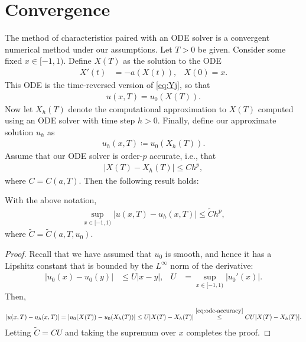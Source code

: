 \documentclass[11pt]{amsart}
\begin{document}
  \section{Convergence}
  The method of characteristics paired with an ODE solver is a convergent numerical method under our assumptions. Let $T >0$ be given. Consider some fixed $x \in [-1,1)$. Define $X(T)$ as the solution to the ODE
    \begin{align}\label{eq:X-ode}
      X'(t) &= -a(X(t)), & X(0) = x.
    \end{align}
    This ODE is the time-reversed version of \eqref{eq:Yj}, so that 
    \begin{align*}
      u(x,T) = u_0(X(T)).
    \end{align*}
    Now let $X_h(T)$ denote the computational approximation to $X(T)$ computed using an ODE solver with time step $h > 0$. Finally, define our approximate solution $u_h$ as
    \begin{align*}
      u_h(x,T) \coloneqq u_0(X_h(T)).
    \end{align*}
    Assume that our ODE solver is order-$p$ accurate, i.e., that
    \begin{align}\label{eq:ode-accuracy}
      \left| X(T) - X_h(T) \right| \leq C h^p,
    \end{align}
    where $C = C(a,T)$. Then the following result holds:
  \begin{proposition}
    With the above notation,
    \begin{align}\label{eq:ode-accuracy}
      \sup_{x \in [-1,1)} \left| u(x,T) - u_h(x,T) \right| \leq \widetilde{C} h^p,
    \end{align}
    where $\widetilde{C} = \widetilde{C}(a, T, u_0)$.
  \end{proposition}
  \begin{proof}
    Recall that we have assumed that $u_0$ is smooth, and hence it has a Lipshitz constant that is bounded by the $L^\infty$ norm of the derivative:
    \begin{align*}
      \left| u_0(x) - u_0(y) \right| &\leq U |x - y|, & U &= \sup_{x \in [-1,1)} |u_0'(x)|.
    \end{align*}
    Then,
    \begin{align*}
      \left| u(x,T) - u_h(x,T) \right| = \left| u_0(X(T)) - u_0(X_h(T)) \right| \leq U | X(T) - X_h(T)| \stackrel{\eqref{eq:ode-accuracy}}{\leq} C U |X(T) - X_h(T)|.
    \end{align*}
    Letting $\widetilde{C} = C U$ and taking the supremum over $x$ completes the proof.
  \end{proof}
\end{document}

